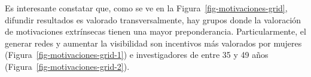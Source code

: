 \documentclass[
  letterpaper,
  DIV=11,
  numbers=noendperiod]{scrreprt}
\begin{document}
Es interesante constatar que, como se ve en la
Figura~\ref{fig-motivaciones-grid}, difundir resultados es valorado
transversalmente, hay grupos donde la valoración de motivaciones
extrínsecas tienen una mayor preponderancia. Particularmente, el generar
redes y aumentar la visibilidad son incentivos más valorados por mujeres
(Figura~\ref{fig-motivaciones-grid-1}) e investigadores de entre 35 y 49
años (Figura~\ref{fig-motivaciones-grid-2}).

\begin{figure}

\begin{minipage}[t]{\linewidth}

{\centering 


}

\end{minipage}%
\newline
\begin{minipage}[t]{\linewidth}

{\centering 

}
\end{minipage}
\end{figure}
\end{document}
